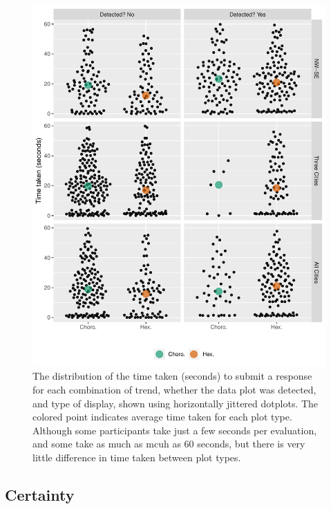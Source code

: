 \documentclass[12pt]{article}
\begin{document}
\begin{figure}
\includegraphics[width=1\linewidth]{kobakiancook_files/figure-latex/beeswarm-1} \caption{The distribution of the time taken (seconds) to submit a response for each combination of trend, whether the data plot was detected, and type of display, shown using horizontally jittered dotplots. The colored point indicates average time taken for each plot type. Although some participants take just a few seconds per evaluation, and some take as much as mcuh as 60 seconds, but there is very little difference in time taken between plot types.}\label{fig:beeswarm}
\end{figure}

\subsection{Certainty}
\label{sec:cer}
\end{document}
